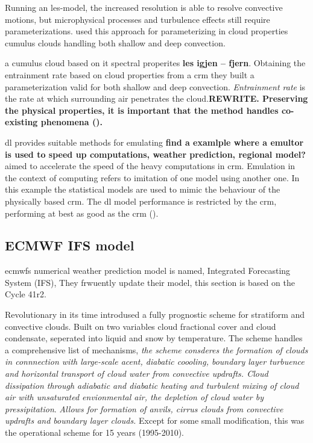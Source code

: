 Running an \acrfull{les}-model, the increased resolution is able to resolve convective motions, but microphysical processes and turbulence effects still require parameterizations. \citeauthor{Baba2019SpectralModel} used this approach for parameterizing in cloud properties cumulus clouds handling both shallow and deep convection.

a cumulus cloud based on it spectral properites \textbf{les igjen -- fjern}. Obtaining the entrainment rate based on cloud properties from a \acrshort{crm} they built a parameterization valid for both shallow and deep convection. \textit{Entrainment rate} is the rate at which surrounding air penetrates the cloud.\textbf{REWRITE. Preserving the physical properties, it is important that the method handles co-existing phenomena (\cite{Baba2019SpectralModel}). }

\acrshort{dl} provides suitable methods for emulating \textbf{find a examlple where a emultor is used to speed up computations, weather prediction, regional model?} %
aimed to accelerate the speed of the heavy computations in \acrshort{crm}. Emulation in the context of computing refers to imitation of one model using another one. In this example the statistical models are used to mimic the behaviour of the physically based \acrshort{crm}. The \acrshort{dl} model performance is restricted by the  \acrshort{crm}, performing at best as good as the \acrshort{crm} (\cite{Rasp2018DeepModels}).

\subsection{ECMWF IFS model} \label{sec:IFS_param}
\acrfull{ecmwf}s numerical weather prediction model is named, Integrated Forecasting System (IFS), They frwuently update their model, this section is based on the Cycle 41r2. 

Revolutionary in its time  introdused a fully prognostic scheme for stratiform and convective clouds. Built on two variables cloud fractional cover and cloud condensate, seperated into liquid and snow by temperature. The scheme handles a comprehensive list of mechanisms, \textit{the scheme consderes the formation of clouds in connnection with large-scale acent, diabatic coooling, boundary layer turbuence and horizontal transport of cloud water from convective updrafts. Cloud dissipation through adiabatic and diabatic heating and turbulent mixing of cloud air with unsaturated envionmental air, the depletion of cloud water by pressipitation}. \textit{Allows for formation of anvils, cirrus clouds from convective updrafts and boundary layer clouds.} 
Except for some small modification, this was the operational scheme for 15 years (1995-2010). 

